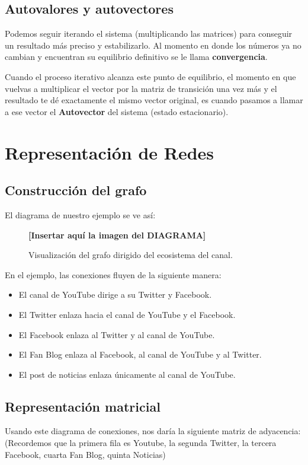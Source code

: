 \documentclass[12pt,letterpaper]{article}
\begin{document}
\subsection{Autovalores y autovectores}
Podemos seguir iterando el sistema (multiplicando las matrices) para conseguir un resultado más preciso y estabilizarlo. Al momento en donde los números ya no cambian y encuentran su equilibrio definitivo se le llama \textbf{convergencia}.

Cuando el proceso iterativo alcanza este punto de equilibrio, el momento en que vuelvas a multiplicar el vector por la matriz de transición una vez más y el resultado te dé exactamente el mismo vector original, es cuando pasamos a llamar a ese vector el \textbf{Autovector} del sistema (estado estacionario).

\section{Representación de Redes}

\subsection{Construcción del grafo}
El diagrama de nuestro ejemplo se ve así:

\begin{figure}[H]
    \centering
    \textbf{[Insertar aquí la imagen del DIAGRAMA]}
    \caption{Visualización del grafo dirigido del ecosistema del canal.}
\end{figure}

En el ejemplo, las conexiones fluyen de la siguiente manera:
\begin{itemize}
    \item El canal de YouTube dirige a su Twitter y Facebook.
    \item El Twitter enlaza hacia el canal de YouTube y el Facebook.
    \item El Facebook enlaza al Twitter y al canal de YouTube.
    \item El Fan Blog enlaza al Facebook, al canal de YouTube y al Twitter.
    \item El post de noticias enlaza únicamente al canal de YouTube.
\end{itemize}

\subsection{Representación matricial}
Usando este diagrama de conexiones, nos daría la siguiente matriz de adyacencia:
(Recordemos que la primera fila es Youtube, la segunda Twitter, la tercera Facebook, cuarta Fan Blog, quinta Noticias)
\end{document}
